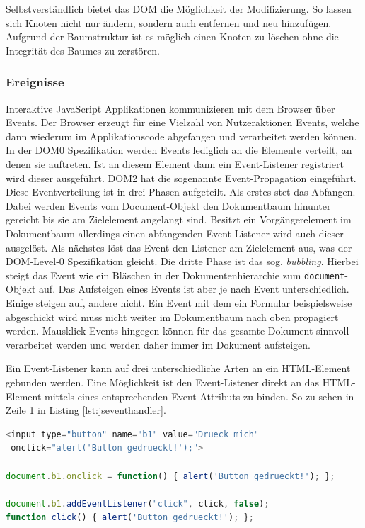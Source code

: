 Selbstverständlich bietet das DOM die Möglichkeit der Modifizierung. So lassen sich Knoten nicht nur ändern, sondern auch entfernen und neu hinzufügen. Aufgrund der Baumstruktur ist es möglich einen Knoten zu löschen ohne die Integrität des Baumes zu zerstören.

\subsubsection{Ereignisse} Interaktive JavaScript Applikationen kommunizieren mit dem Browser über Events. Der Browser erzeugt für eine Vielzahl von Nutzeraktionen Events, welche dann wiederum im Applikationscode abgefangen und verarbeitet werden können. In der DOM0 Spezifikation werden Events lediglich an die Elemente verteilt, an denen sie auftreten. Ist an diesem Element dann ein Event-Listener registriert wird dieser ausgeführt. DOM2 hat die sogenannte Event-Propagation eingeführt. Diese Eventverteilung ist in drei Phasen aufgeteilt. Als erstes stet das Abfangen. Dabei werden Events vom Document-Objekt den Dokumentbaum hinunter gereicht bis sie am Zielelement angelangt sind. Besitzt ein Vorgängerelement im Dokumentbaum allerdings einen abfangenden Event-Listener wird auch dieser ausgelöst. Als nächstes löst das Event den Listener am Zielelement aus, was der DOM-Level-0 Spezifikation gleicht. Die dritte Phase ist das sog. \textit{bubbling}. Hierbei steigt das Event wie ein Bläschen in der Dokumentenhierarchie zum \texttt{document}-Objekt auf. Das Aufsteigen eines Events ist aber je nach Event unterschiedlich. Einige steigen auf, andere nicht. Ein Event mit dem ein Formular beispielsweise abgeschickt wird muss nicht weiter im Dokumentbaum nach oben propagiert werden. Mausklick-Events hingegen können für das gesamte Dokument sinnvoll verarbeitet werden und werden daher immer im Dokument aufsteigen.\par Ein Event-Listener kann auf drei unterschiedliche Arten an ein HTML-Element gebunden werden. Eine Möglichkeit ist den Event-Listener direkt an das HTML-Element mittels eines entsprechenden Event Attributs zu binden. So zu sehen in Zeile 1 in Listing \ref{lst:jseventhandler}. 

\vspace{1em}
\begin{lstlisting}[language=JavaScript, caption=JavaScript Event-Handler Beispiek, label=lst:jseventhandler]
<input type="button" name="b1" value="Drueck mich"
 onclick="alert('Button gedrueckt!');">

document.b1.onclick = function() { alert('Button gedrueckt!'); };

document.b1.addEventListener("click", click, false);
function click() { alert('Button gedrueckt!'); };
\end{lstlisting}

